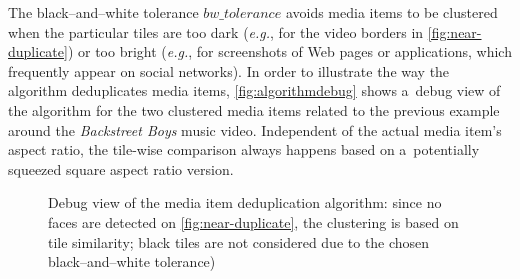 \documentclass{article}
\begin{document}
The black--and--white tolerance $\textit{bw\_tolerance}$ avoids media items to be clustered when the particular tiles are too dark (\emph{e.g.}, for the video borders in \autoref{fig:near-duplicate}) or too bright (\emph{e.g.}, for screenshots of Web pages or applications, which frequently appear on social networks). In order to illustrate the way the algorithm deduplicates media items, \autoref{fig:algorithmdebug} shows a~debug view of the algorithm for the two clustered media items related to the previous example around the \emph{Backstreet Boys} music video. Independent of the actual media item's aspect ratio, the tile-wise comparison always happens based on a~potentially squeezed square aspect ratio version.

\begin{figure}[t!]
  \centering
  \caption{Debug view of the media item deduplication algorithm: since no faces are detected on \autoref{fig:near-duplicate}, the clustering is based on tile similarity; black tiles are not considered due to the chosen black--and--white tolerance)}
  \label{fig:algorithmdebug}
\end{figure}
\end{document}
